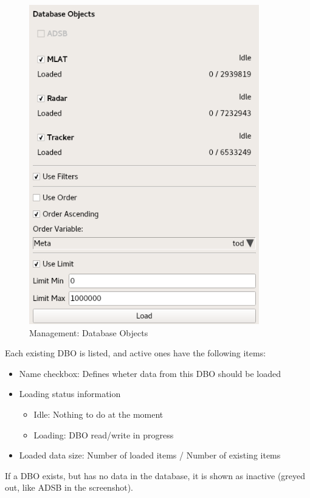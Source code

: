 \documentclass[10pt,letterpaper,extrafontsizes]{memoir}
\begin{document}
\begin{figure}[H]
  \center
    \includegraphics[width=10cm]{../screenshots/management_dbos.png}
  \caption{Management: Database Objects}
  \label{fig:management_objects}
\end{figure}

Each existing DBO is listed, and active ones have the following items:

\begin{itemize}
 \item Name checkbox: Defines wheter data from this DBO should be loaded
 \item Loading status information
  \begin{itemize}
  \item Idle: Nothing to do at the moment
  \item Loading: DBO read/write in progress
  \end{itemize}
 \item Loaded data size: Number of loaded items / Number of existing items
\end{itemize}

If a DBO exists, but has no data in the database, it is shown as inactive (greyed out, like ADSB in the screenshot).\\
\end{document}
